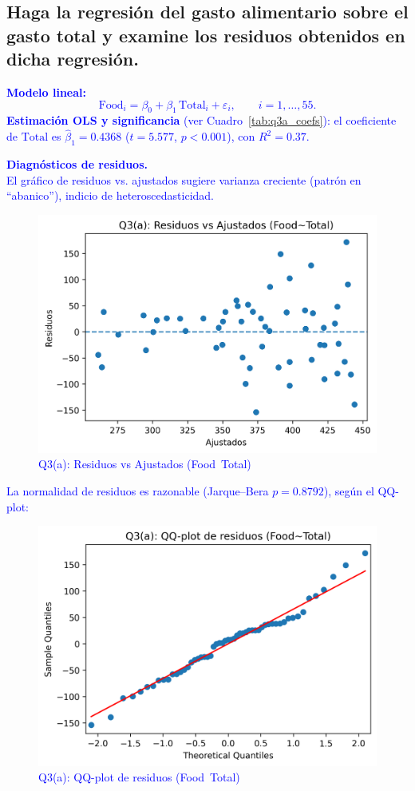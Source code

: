\documentclass[10pt]{article}
\begin{document}
\subsection{Haga la regresión del gasto alimentario sobre el gasto total y examine los residuos obtenidos en dicha regresión.}
    \textcolor{blue}{
        \textbf{Modelo lineal:} \\
        \begin{equation*}
        \text{Food}_i = \beta_0 + \beta_1\,\text{Total}_i + \varepsilon_i,\qquad i=1,\dots,55.
        \end{equation*}
        \textbf{Estimación OLS y significancia} (ver Cuadro~\ref{tab:q3a_coefs}): el coeficiente de $\text{Total}$ es \(\hat\beta_1=0.4368\) (\(t=5.577\), $p<0.001$), con \(R^2=0.37\).
        
    }
    \textcolor{blue}{
        \textbf{Diagnósticos de residuos.} \\
        El gráfico de residuos vs. ajustados sugiere varianza creciente (patrón en ``abanico''), indicio de heteroscedasticidad.
        \begin{figure}[H]
            \centering
            \includegraphics[width=0.7\linewidth]{../plots/python/ex3/q3_a_resid_vs_fitted.png}
            \caption{Q3(a): Residuos vs Ajustados (Food~Total)}
            \label{fig:q3_a_resid}
        \end{figure}
        \newpage
        La normalidad de residuos es razonable (Jarque–Bera $p=0.8792$), según el QQ-plot:
        \begin{figure}[H]
            \centering
            \includegraphics[width=0.7\linewidth]{../plots/python/ex3/q3_a_resid_qqplot.png}
            \caption{Q3(a): QQ-plot de residuos (Food~Total)}
            \label{fig:q3_a_qq}
        \end{figure}
    }
\end{document}
